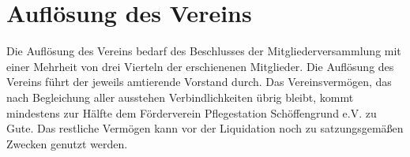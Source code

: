\section{Auflösung des Vereins}	\label{17}
Die Auflösung des Vereins bedarf des Beschlusses der Mitgliederversammlung mit einer Mehrheit von drei Vierteln der erschienenen Mitglieder.
Die Auflösung des Vereins führt der jeweils amtierende Vorstand durch. Das Vereinsvermögen, das nach Begleichung aller ausstehen Verbindlichkeiten übrig bleibt, kommt mindestens zur Hälfte dem Förderverein Pflegestation Schöffengrund e.V. zu Gute. Das restliche Vermögen kann vor der Liquidation noch zu satzungsgemäßen Zwecken genutzt werden. 
















